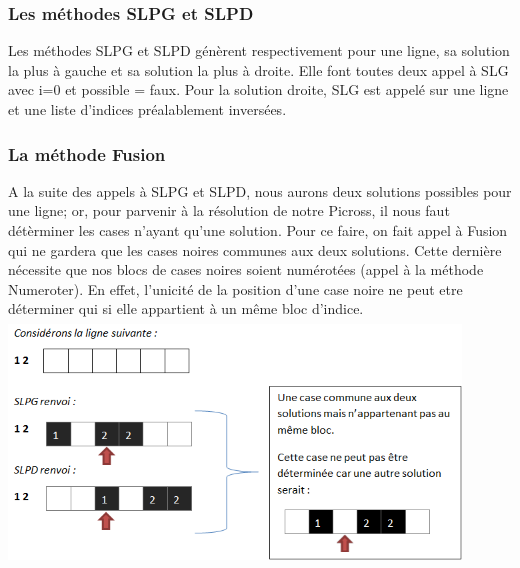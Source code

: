 \documentclass{article}
\begin{document}
\subsubsection{Les m\'ethodes SLPG et SLPD}
Les m\'ethodes SLPG et SLPD g\'en\`erent respectivement pour une ligne, sa solution la plus \`a gauche et sa solution la plus \`a droite. Elle font toutes deux appel \`a SLG avec i=0 et possible = faux. 
\newline
Pour la solution droite, SLG est appel\'e sur une ligne et une liste d'indices pr\'ealablement invers\'ees.
\subsubsection{La m\'ethode Fusion}
A la suite des appels \`a SLPG et SLPD, nous aurons deux solutions possibles pour une ligne; or, pour parvenir \`a la r\'esolution de notre Picross, il nous faut d\'et\`erminer les cases n'ayant qu'une solution. 
Pour ce faire, on fait appel \`a Fusion qui ne gardera que les cases noires communes aux deux solutions.
Cette derni\`ere n\'ecessite que nos blocs de cases noires soient num\'erot\'ees (appel \`a la m\'ethode Numeroter).
\newline
En effet, l'unicit\'e de la position d'une case noire ne peut etre d\'eterminer qui si elle appartient \`a un m\^eme bloc d'indice.
\newline
\includegraphics[height=6.5cm,width=12cm]{Exemple1}
\end{document}
